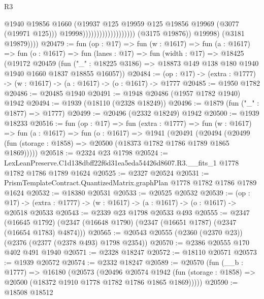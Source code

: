 \begin{lexlean}{R3}
\begin{coremodule}
                                                    @1940
                                                    @19856
                                                    @1660
                                                    (@19937
                                                      @125
                                                      @19959
                                                      @125
                                                      @19856
                                                      @19969
                                                      (@3077 (@19971 @125)))
                                                    @19998)))))))))))))))))))
              (@3175 @19876))
            @19998)
          (@3181 @19879))))
@20479 := fun (op : @17) =>
  fun (w : @1617) =>
  fun (a : @1617) =>
  fun (o : @1617) =>
  fun (lanes : @17) =>
  fun (width : @17) =>
  @18425
    (@19172
      @20459
      (fun ("_" : @18225 @3186) => @18873 @149 @138 @180 @1940 @1940 @1660 @1837 @18855 @16057))
@20484 := (op : @17) -> (extra : @1777) -> (w : @1617) -> (a : @1617) -> (o : @1617) -> @1777
@20485 := @1950 @1782
@20486 := @20485 @1940
@20491 := @1948 @20486 (@1957 @1782 @1940) @1942
@20494 := @1939 (@18110 (@2328 @18249))
@20496 := @1879 (fun ("_" : @1877) => @1777)
@20499 := @20496 (@2332 @18249) @1942
@20500 := @1939 @18233
@20516 := fun (op : @17) =>
  fun (extra : @1777) =>
  fun (w : @1617) =>
  fun (a : @1617) =>
  fun (o : @1617) =>
  @1941
    (@20491
      (@20494 (@20499 (fun (storage : @1858) => @20500 (@18373 @1782 @1786 @1789 @1865 @1869)))))
@20518 := @2324 @23 @1798
@20524 := LexLeanPreserve.C1d138dbff22f6d31ea5eda54426d8607.R3.__fits_1
    @1778
    @1782
    @1786
    @1789
    @1624
@20525 := @2327 @20524
@20531 := PrismTemplateContract.QuantizedMatrix.graphPlan @1778 @1782 @1786 @1789 @1624
@20532 := @18380 @20531
@20533 := @20525 @20532
@20539 := (op : @17) ->
  (extra : @1777) -> (w : @1617) -> (a : @1617) -> (o : @1617) -> @20518 @20533
@20543 := @2339 @23 @1798 @20533 @493
@20555 := @2347
    (@16645 @1792)
    (@2347 (@16648 @1790) (@2347 (@16651 @1787) (@2347 (@16654 @1783) @4874)))
@20565 := @20543 @20555 (@2360 (@2370 @23)) (@2376 (@2377 (@2378 @493) @1798 @2354))
@20570 := @2386 @20555 @170 @402 @491 @1940
@20571 := @2328 @18247
@20572 := @18110 @20571
@20573 := @1939 @20572
@20574 := @2332 @18247
@20589 := @20570
    (fun (__b : @1777) =>
    @16180
      (@20573
        (@20496
          @20574
          @1942
          (fun (storage : @1858) => @20500 (@18372 @1910 @1778 @1782 @1786 @1865 @1869)))))
@20590 := @18508 @18512

\end{coremodule}
\end{lexlean}
